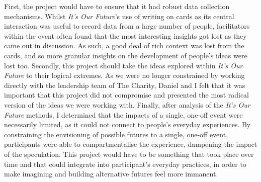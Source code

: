 First, the project would have to ensure that it had robust data collection mechanisms. Whilst \emph{It's Our Future}'s use of writing on cards as its central interaction was useful to record data from a large number of people, facilitators within the event often found that the most interesting insights got lost as they came out in discussion. As such, a good deal of rich context was lost from the cards, and so more granular insights on the development of people's ideas were lost too. Secondly, this project should take the ideas explored within \emph{It's Our Future} to their logical extremes. As we were no longer constrained by working directly with the leadership team of The Charity, Daniel and I felt that it was important that this project did not compromise and presented the most radical version of the ideas we were working with. Finally, after analysis of the \emph{It's Our Future} methods, I determined that the impacts of a single, one-off event were necessarily limited, as it could not connect to people's everyday experiences. By constraining the envisioning of possible futures to a single, one-off event, participants were able to compartmentalise the experience, dampening the impact of the speculation. This project would have to be something that took place over time and that could integrate into participant's everyday practices, in order to make imagining and building alternative futures feel more immanent.  

